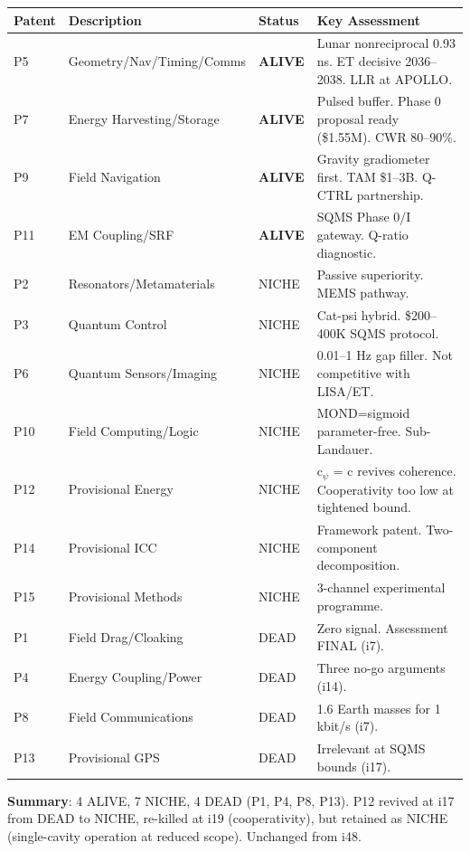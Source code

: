 \documentclass[11pt,a4paper]{article}
\begin{document}
\begin{center}
\begin{longtable}{lllp{6cm}}
\toprule
\textbf{Patent} & \textbf{Description} & \textbf{Status} & \textbf{Key Assessment} \\
\midrule
\endfirsthead
P5 & Geometry/Nav/Timing/Comms & \textbf{ALIVE} & Lunar nonreciprocal 0.93 ns. ET decisive 2036--2038. LLR at APOLLO. \\
P7 & Energy Harvesting/Storage & \textbf{ALIVE} & Pulsed buffer. Phase 0 proposal ready (\$1.55M). CWR 80--90\%. \\
P9 & Field Navigation & \textbf{ALIVE} & Gravity gradiometer first. TAM \$1--3B. Q-CTRL partnership. \\
P11 & EM Coupling/SRF & \textbf{ALIVE} & SQMS Phase 0/I gateway. Q-ratio diagnostic. \\
\midrule
P2 & Resonators/Metamaterials & NICHE & Passive superiority. MEMS pathway. \\
P3 & Quantum Control & NICHE & Cat-psi hybrid. \$200--400K SQMS protocol. \\
P6 & Quantum Sensors/Imaging & NICHE & 0.01--1 Hz gap filler. Not competitive with LISA/ET. \\
P10 & Field Computing/Logic & NICHE & MOND=sigmoid parameter-free. Sub-Landauer. \\
P12 & Provisional Energy & NICHE & c$_\psi$ = c revives coherence. Cooperativity too low at tightened bound. \\
P14 & Provisional ICC & NICHE & Framework patent. Two-component decomposition. \\
P15 & Provisional Methods & NICHE & 3-channel experimental programme. \\
\midrule
P1 & Field Drag/Cloaking & DEAD & Zero signal. Assessment FINAL (i7). \\
P4 & Energy Coupling/Power & DEAD & Three no-go arguments (i14). \\
P8 & Field Communications & DEAD & 1.6 Earth masses for 1 kbit/s (i7). \\
P13 & Provisional GPS & DEAD & Irrelevant at SQMS bounds (i17). \\
\bottomrule
\end{longtable}
\end{center}

\textbf{Summary}: 4 ALIVE, 7 NICHE, 4 DEAD (P1, P4, P8, P13). P12 revived at i17 from DEAD to NICHE, re-killed at i19 (cooperativity), but retained as NICHE (single-cavity operation at reduced scope). Unchanged from i48.
\end{document}
